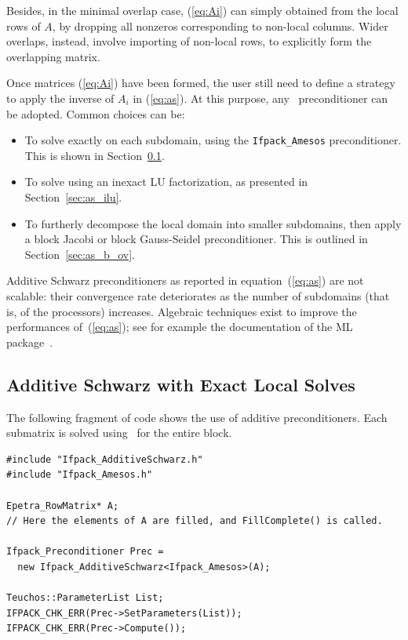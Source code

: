 Besides, in the minimal overlap case, (\ref{eq:Ai}) can simply obtained from
the local rows of $A$, by dropping all nonzeros corresponding to non-local
columns. Wider overlaps, instead, involve importing of non-local rows, to
explicitly form the overlapping matrix.

\smallskip

Once matrices (\ref{eq:Ai}) have been formed, the user still need to define a
strategy to apply the inverse of $A_i$ in (\ref{eq:as}). At this purpose,
any \ifpack\ preconditioner can be adopted. Common choices can be:
\begin{itemize}
\item To solve exactly on each subdomain, using the \verb!Ifpack_Amesos!
preconditioner. This is shown in Section~\ref{sec:as_amesos}.
\item To solve using an inexact LU factorization, as presented in
Section~\ref{sec:as_ilu}.
\item To furtherly decompose the local domain into smaller subdomains,
  then apply a block Jacobi or block Gauss-Seidel preconditioner. This is
  outlined in Section~\ref{sec:as_b_ov}.
\end{itemize}

\begin{remark}
Additive Schwarz preconditioners as reported in equation~(\ref{eq:as}) 
are not scalable: their convergence rate
deteriorates as the number of subdomains (that is, of the processors)
increases. Algebraic techniques
exist to improve the performances of~(\ref{eq:as}); 
see for example the documentation of the ML
package~\cite{ml-guide}.
\end{remark}

\subsection{Additive Schwarz with Exact Local Solves}
\label{sec:as_amesos}

The following fragment of code shows the use of additive preconditioners. Each
submatrix is solved using \amesos\ for the entire block.
\begin{verbatim}
#include "Ifpack_AdditiveSchwarz.h"
#include "Ifpack_Amesos.h"

Epetra_RowMatrix* A;
// Here the elements of A are filled, and FillComplete() is called.

Ifpack_Preconditioner Prec = 
  new Ifpack_AdditiveSchwarz<Ifpack_Amesos>(A);

Teuchos::ParameterList List;
IFPACK_CHK_ERR(Prec->SetParameters(List));
IFPACK_CHK_ERR(Prec->Compute());
\end{verbatim}

